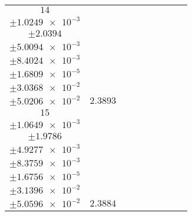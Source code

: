 \documentclass[8pt]{article}
\begin{document}
\begin{longtable}[l]{c c c c c c c c c}
$\num{14}$ & \begin{tabular}[c]{@{}c@{}}$\num{2.9472e-2}$ \\ $\pm\num{1.0249e-3}$\end{tabular} & \begin{tabular}[c]{@{}c@{}}$\num{0.203}$ \\ $\pm\num{2.0394}$\end{tabular} & \begin{tabular}[c]{@{}c@{}}$\num{-0.321}$ \\ $\pm\num{5.0094e-3}$\end{tabular} & \begin{tabular}[c]{@{}c@{}}$\num{3.6264e+3}$ \\ $\pm\num{8.4024e-3}$\end{tabular} & \begin{tabular}[c]{@{}c@{}}$\num{7.2548}$ \\ $\pm\num{1.6809e-5}$\end{tabular} & \begin{tabular}[c]{@{}c@{}}$\num{1.1744}$ \\ $\pm\num{3.0368e-2}$\end{tabular} & \begin{tabular}[c]{@{}c@{}}$\num{4.1171}$ \\ $\pm\num{5.0206e-2}$\end{tabular} & $\num{2.3893}$\\
$\num{15}$ & \begin{tabular}[c]{@{}c@{}}$\num{2.9454e-2}$ \\ $\pm\num{1.0649e-3}$\end{tabular} & \begin{tabular}[c]{@{}c@{}}$\num{1.7244e-2}$ \\ $\pm\num{1.9786}$\end{tabular} & \begin{tabular}[c]{@{}c@{}}$\num{0.32086}$ \\ $\pm\num{4.9277e-3}$\end{tabular} & \begin{tabular}[c]{@{}c@{}}$\num{3.627e+3}$ \\ $\pm\num{8.3759e-3}$\end{tabular} & \begin{tabular}[c]{@{}c@{}}$\num{7.256}$ \\ $\pm\num{1.6756e-5}$\end{tabular} & \begin{tabular}[c]{@{}c@{}}$\num{1.1753}$ \\ $\pm\num{3.1396e-2}$\end{tabular} & \begin{tabular}[c]{@{}c@{}}$\num{4.1185}$ \\ $\pm\num{5.0596e-2}$\end{tabular} & $\num{2.3884}$\\

\end{longtable}
\end{document}
